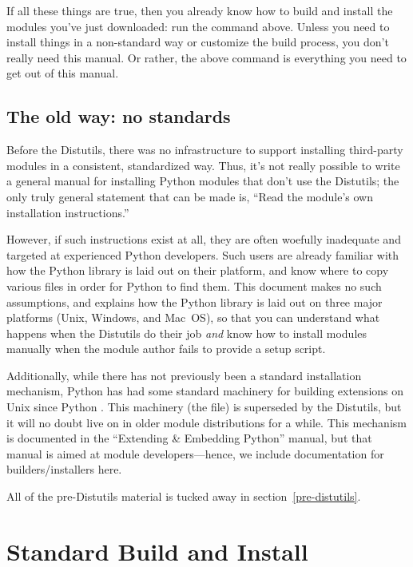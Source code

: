 \documentclass{howto}
\begin{document}
If all these things are true, then you already know how to build and
install the modules you've just downloaded: run the command above.
Unless you need to install things in a non-standard way or customize the
build process, you don't really need this manual.  Or rather, the above
command is everything you need to get out of this manual.


\subsection{The old way: no standards}
\label{old-way}

Before the Distutils, there was no infrastructure to support installing
third-party modules in a consistent, standardized way.  Thus, it's not
really possible to write a general manual for installing Python modules
that don't use the Distutils; the only truly general statement that can
be made is, ``Read the module's own installation instructions.''

However, if such instructions exist at all, they are often woefully
inadequate and targeted at experienced Python developers.  Such users
are already familiar with how the Python library is laid out on their
platform, and know where to copy various files in order for Python to
find them.  This document makes no such assumptions, and explains how
the Python library is laid out on three major platforms (Unix, Windows,
and Mac~OS), so that you can understand what happens when the Distutils
do their job \emph{and} know how to install modules manually when the
module author fails to provide a setup script.

Additionally, while there has not previously been a standard
installation mechanism, Python has had some standard machinery for
building extensions on Unix since Python .  This machinery
(the  file) is superseded by the Distutils, but it
will no doubt live on in older module distributions for a while.  This
 mechanism is documented in the ``Extending \&
Embedding Python'' manual, but that manual is aimed at module
developers---hence, we include documentation for builders/installers
here.

All of the pre-Distutils material is tucked away in
section~\ref{pre-distutils}.


\section{Standard Build and Install}
\label{standard-install}
\end{document}
